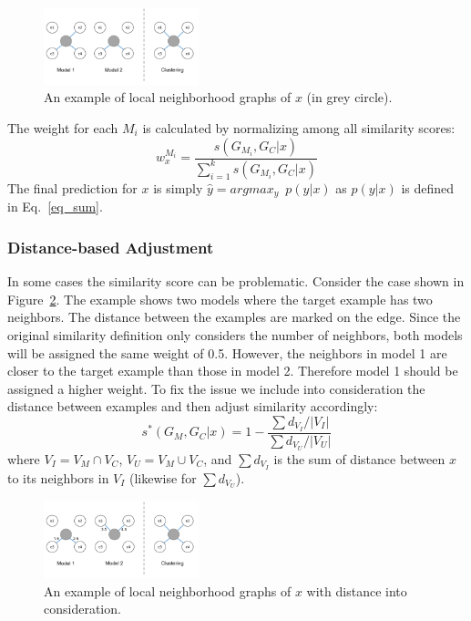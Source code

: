 \begin{figure}[h]
\centering
    \includegraphics[width=0.4\textwidth]{./fig/lwe_graph}
\caption{An example of local neighborhood graphs of $x$ (in grey circle).}
\label{fig:graph}
\end{figure}

The weight for each $M_i$ is calculated by normalizing among all similarity scores:
\begin{equation}\label{eq_norm}
w_{x}^{M_i} = \frac {s(G_{M_i}, G_C|x)} {\sum_{i=1}^k s(G_{M_i}, G_C|x)}
\end{equation}
The final prediction for $x$ is simply $\hat y = argmax_y \enspace p(y|x)$ as $p(y|x)$ is defined in Eq.~\ref{eq_sum}.

\subsubsection{Distance-based Adjustment}
In some cases the similarity score can be problematic. Consider the case shown in Figure~\ref{graph_dist}.
The example shows two models where the target example has two neighbors.  The distance between the examples are marked on the edge.
Since the original similarity definition only considers the number of neighbors, both models will be assigned the same weight of 0.5.
However, the neighbors in model 1 are closer to the target example than those in model 2.  Therefore model 1 should be assigned a higher
weight.
To fix the issue we include into consideration the distance between examples and then adjust similarity accordingly:
\begin{equation}\label{d_sim}
s^\ast(G_M, G_C|x) = 1 - \frac {\sum d_{V_I}/|V_I|} {\sum d_{V_U}/|V_U|}
\end{equation}
where $V_I = V_M \cap V_C$, $V_U = V_M \cup V_C$, and $\sum d_{V_I}$ is the sum of distance between $x$ to its neighbors in $V_I$ (likewise for $\sum d_{V_U}$).

\begin{figure}[h]
\centering
    \includegraphics[width=0.4\textwidth]{./fig/lwe_d_graph}
\caption{An example of local neighborhood graphs of $x$ with distance into consideration.}
\label{graph_dist}
\end{figure}

